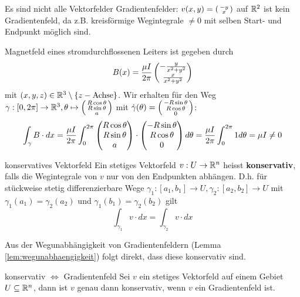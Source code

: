 \begin{example}
Es sind nicht alle Vektorfelder Gradientenfelder: $v(x,y) = \left(\begin{smallmatrix} -y\\x \end{smallmatrix}\right)$ auf $\mathbb{R}^2$ ist kein Gradientenfeld, da z.B. kreisförmige Wegintegrale $\neq 0$ mit selben Start- und Endpunkt möglich sind.
\end{example}
\begin{example} Magnetfeld eines stromdurchflossenen Leiters ist gegeben durch
$$B(x) = \frac{\mu I}{2 \pi}\begin{pmatrix}-\frac{y}{x^2+y^2}\\\frac{x}{x^2+y^2}\end{pmatrix}$$
mit $(x,y,z) \in \mathbb{R}^3\setminus\{z-\text{Achse}\}$. Wir erhalten für den Weg $\gamma:[0, 2\pi]\to \mathbb{R}^3, \theta \mapsto \left(\begin{smallmatrix} R\cos \theta\\R\sin\theta\\a \end{smallmatrix}\right)$ mit $\Dot{\gamma}(\theta) = \left(\begin{smallmatrix} -R\sin\theta\\R \cos \theta\\0 \end{smallmatrix}\right)$:
$$\int_\gamma B\cdot dx = \frac{\mu I }{2 \pi} \int_0^{2\pi} \begin{pmatrix}R\cos \theta\\R\sin\theta\\a\end{pmatrix} \cdot \begin{pmatrix}-R\sin\theta\\R \cos \theta\\0\end{pmatrix} d\theta =  \frac{\mu I }{2 \pi} \int_0^{2\pi} 1 d\theta = \mu I \ne 0$$
\end{example}


\begin{definition}{konservatives Vektorfeld}{}
Ein stetiges Vektorfeld $v: U \to \mathbb{R}^n$ heisst \textbf{konservativ}, falls die Wegintegrale von $v$ nur von den Endpunkten abhängen. D.h. für stückweise stetig differenzierbare Wege $\gamma_1:[a_1, b_1] \to U, \gamma_2:[a_2,b_2] \to U$ mit $\gamma_1(a_1) = \gamma_2(a_2)$ und $\gamma_1(b_1) = \gamma_2(b_2)$ gilt
$$\int_{\gamma_1}v \cdot dx = \int_{\gamma_2}v\cdot dx$$
\end{definition}

Aus der Wegunabhängigkeit von Gradientenfeldern (Lemma \ref{lem:wegunabhaengigkeit}) folgt direkt, dass diese konservativ sind.

\begin{satz}{konservativ $\iff$ Gradientenfeld}{}
Sei $v$ ein stetiges Vektorfeld auf einem Gebiet $U \subseteq \mathbb{R}^n$, dann ist $v$ genau dann konservativ, wenn $v$ ein Gradientenfeld ist.
\end{satz}

